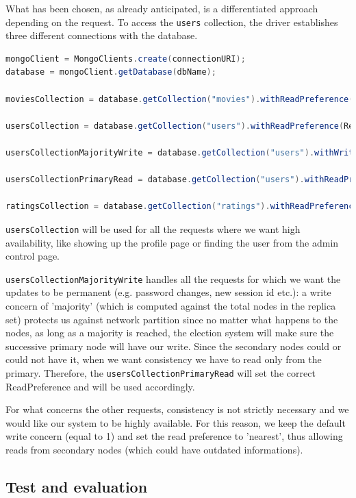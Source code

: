 \documentclass[11pt]{article}
\begin{document}
What has been chosen, as already anticipated, is a differentiated approach depending on the request. To access the \lstinline{users} collection, the driver establishes three different connections with the database.

\begin{lstlisting}[language=Java]
mongoClient = MongoClients.create(connectionURI);
database = mongoClient.getDatabase(dbName);

moviesCollection = database.getCollection("movies").withReadPreference(ReadPreference.nearest());

usersCollection = database.getCollection("users").withReadPreference(ReadPreference.nearest());

usersCollectionMajorityWrite = database.getCollection("users").withWriteConcern(WriteConcern.MAJORITY);

usersCollectionPrimaryRead = database.getCollection("users").withReadPreference(ReadPreference.primary());

ratingsCollection = database.getCollection("ratings").withReadPreference(ReadPreference.nearest());
\end{lstlisting}

\lstinline{usersCollection} will be used for all the requests where we want high availability, like showing up the profile page or finding the user from the admin control page.

\lstinline{usersCollectionMajorityWrite} handles all the requests for which we want the updates to be permanent (e.g. password changes, new session id etc.): a write concern of 'majority' (which is computed against the total nodes in the replica set) protects us against network partition since no matter what happens to the nodes, as long as a majority is reached, the election system will make sure the successive primary node will have our write. Since the secondary nodes could or could not have it, when we want consistency we have to read only from the primary. Therefore, the \lstinline{usersCollectionPrimaryRead} will set the correct ReadPreference and will be used accordingly.

For what concerns the other requests, consistency is not strictly necessary and we would like our system to be highly available. For this reason, we keep the default write concern (equal to 1) and set the read preference to 'nearest', thus allowing reads from secondary nodes (which could have outdated informations).

\subsection{Test and evaluation}
\end{document}
